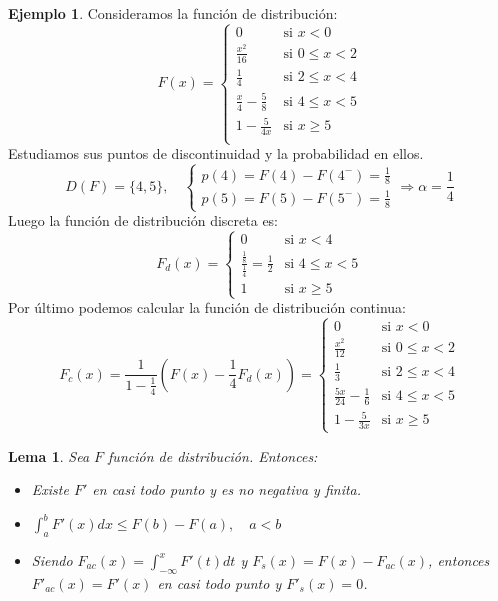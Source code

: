 \documentclass{report}
\newtheorem{lemma}[theorem]{Lema}
\theoremstyle{remark}
\theoremstyle{remark}
\theoremstyle{remark}
\theoremstyle{definition}
\theoremstyle{definition}
\theoremstyle{definition}
\newtheorem*{example}{Ejemplo}
\theoremstyle{definition}
\begin{document}
\begin{example}
    Consideramos la función de distribución:
    $$F(x) = \begin{cases}
            0                         & \text{si } x < 0        \\
            \frac{x^2}{16}            & \text{si } 0 \leq x < 2 \\
            \frac{1}{4}               & \text{si } 2 \leq x < 4 \\
            \frac{x}{4} - \frac{5}{8} & \text{si } 4 \leq x < 5 \\
            1 - \frac{5}{4x}          & \text{si } x \geq 5     \\
        \end{cases}$$
    Estudiamos sus puntos de discontinuidad y la probabilidad en ellos.
    $$D(F) = \{4, 5\}, \quad \begin{cases}
            p(4) = F(4) - F(4^-) = \frac{1}{8} \\
            p(5) = F(5) - F(5^-) = \frac{1}{8}
        \end{cases}
        \Rightarrow \alpha = \frac{1}{4}$$
    Luego la función de distribución discreta es:
    $$F_d(x) = \begin{cases}
            0                                             & \text{si } x < 4        \\
            \frac{\frac{1}{8}}{\frac{1}{4}} = \frac{1}{2} & \text{si } 4 \leq x < 5 \\
            1                                             & \text{si } x \geq 5
        \end{cases}$$
    Por último podemos calcular la función de distribución continua:
    $$F_c(x) = \frac{1}{1-\frac{1}{4}} \left( F(x) - \frac{1}{4}F_d(x) \right) = \begin{cases}
            0                           & \text{si } x < 0        \\
            \frac{x^2}{12}              & \text{si } 0 \leq x < 2 \\
            \frac{1}{3}                 & \text{si } 2 \leq x < 4 \\
            \frac{5x}{24} - \frac{1}{6} & \text{si } 4 \leq x < 5 \\
            1 - \frac{5}{3x}            & \text{si } x \geq 5
        \end{cases}$$
\end{example}

\begin{lemma}
    Sea $F$ función de distribución.
    Entonces:
    \begin{itemize}
        \item Existe $F'$ en casi todo punto y es no negativa y finita.
        \item $\int_a^b F'(x) dx \leq F(b) - F(a), \quad a<b$
        \item Siendo $F_{ac}(x) = \int_{-\infty}^x F'(t) dt$ y $F_s(x) = F(x) - F_{ac}(x)$, entonces $F'_{ac}(x) = F'(x)$ en casi todo punto y $F'_s(x) = 0$.
    \end{itemize}
\end{lemma}
\end{document}
